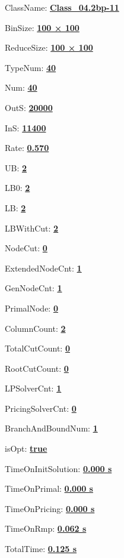 \documentclass[11pt]{article}
\begin{document}
\pagestyle{empty}


ClassName: \underline{\textbf{Class_04.2bp-11}}
\par
BinSize: \underline{\textbf{100 × 100}}
\par
ReduceSize: \underline{\textbf{100 × 100}}
\par
TypeNum: \underline{\textbf{40}}
\par
Num: \underline{\textbf{40}}
\par
OutS: \underline{\textbf{20000}}
\par
InS: \underline{\textbf{11400}}
\par
Rate: \underline{\textbf{0.570}}
\par
UB: \underline{\textbf{2}}
\par
LB0: \underline{\textbf{2}}
\par
LB: \underline{\textbf{2}}
\par
LBWithCut: \underline{\textbf{2}}
\par
NodeCut: \underline{\textbf{0}}
\par
ExtendedNodeCnt: \underline{\textbf{1}}
\par
GenNodeCnt: \underline{\textbf{1}}
\par
PrimalNode: \underline{\textbf{0}}
\par
ColumnCount: \underline{\textbf{2}}
\par
TotalCutCount: \underline{\textbf{0}}
\par
RootCutCount: \underline{\textbf{0}}
\par
LPSolverCnt: \underline{\textbf{1}}
\par
PricingSolverCnt: \underline{\textbf{0}}
\par
BranchAndBoundNum: \underline{\textbf{1}}
\par
isOpt: \underline{\textbf{true}}
\par
TimeOnInitSolution: \underline{\textbf{0.000 s}}
\par
TimeOnPrimal: \underline{\textbf{0.000 s}}
\par
TimeOnPricing: \underline{\textbf{0.000 s}}
\par
TimeOnRmp: \underline{\textbf{0.062 s}}
\par
TotalTime: \underline{\textbf{0.125 s}}
\par
\newpage
\end{document}
